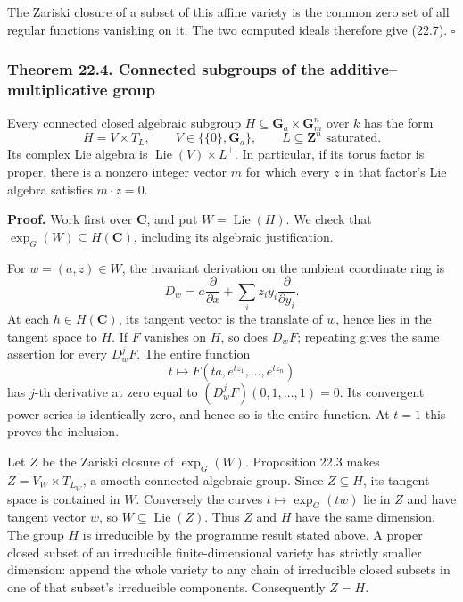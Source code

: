 \documentclass[
  11pt,
  a4paper,
]{article}
\begin{document}
The Zariski closure of a subset of this affine variety is the common
zero set of all regular functions vanishing on it. The two computed
ideals therefore give (22.7). \(\square\)

\subsubsection{Theorem 22.4. Connected subgroups of the
additive--multiplicative
group}\label{theorem-22.4.-connected-subgroups-of-the-additivemultiplicative-group}

Every connected closed algebraic subgroup
\(H\subseteq\mathbf G_a\times\mathbf G_m^n\) over \(k\) has the form \[
 H=V\times T_L,
 \qquad V\in\{\{0\},\mathbf G_a\},
 \qquad L\subseteq\mathbf Z^n\text{ saturated}.
 \tag{22.10}
\] Its complex Lie algebra is \(\operatorname{Lie}(V)\times L^\perp\).
In particular, if its torus factor is proper, there is a nonzero integer
vector \(m\) for which every \(z\) in that factor's Lie algebra
satisfies \(m\cdot z=0\).

\textbf{Proof.} Work first over \(\mathbf C\), and put
\(W=\operatorname{Lie}(H)\). We check that
\(\exp_G(W)\subseteq H(\mathbf C)\), including its algebraic
justification.

For \(w=(a,z)\in W\), the invariant derivation on the ambient coordinate
ring is \[
 D_w=a\frac{\partial}{\partial x}
       +\sum_i z_i y_i\frac{\partial}{\partial y_i}.
 \tag{22.11}
\] At each \(h\in H(\mathbf C)\), its tangent vector is the translate of
\(w\), hence lies in the tangent space to \(H\). If \(F\) vanishes on
\(H\), so does \(D_wF\); repeating gives the same assertion for every
\(D_w^jF\). The entire function \[
 t\longmapsto F(ta,e^{tz_1},\ldots,e^{tz_n})
\] has \(j\)-th derivative at zero equal to
\((D_w^jF)(0,1,\ldots,1)=0\). Its convergent power series is identically
zero, and hence so is the entire function. At \(t=1\) this proves the
inclusion.

Let \(Z\) be the Zariski closure of \(\exp_G(W)\). Proposition 22.3
makes \(Z=V_W\times T_{L_W}\), a smooth connected algebraic group. Since
\(Z\subseteq H\), its tangent space is contained in \(W\). Conversely
the curves \(t\mapsto\exp_G(tw)\) lie in \(Z\) and have tangent vector
\(w\), so \(W\subseteq\operatorname{Lie}(Z)\). Thus \(Z\) and \(H\) have
the same dimension. The group \(H\) is irreducible by the programme
result stated above. A proper closed subset of an irreducible
finite-dimensional variety has strictly smaller dimension: append the
whole variety to any chain of irreducible closed subsets in one of that
subset's irreducible components. Consequently \(Z=H\).
\end{document}
